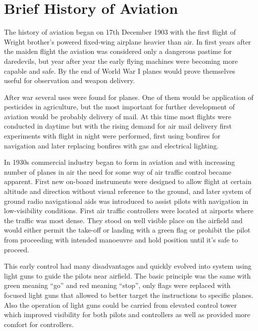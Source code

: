 
\section{Brief History of Aviation}

The history of aviation began on 17th December 1903 with the first flight of Wright brother's powered fixed-wing airplane heavier than air. \cite{nolan} In first years after the maiden flight the aviation was considered only a dangerous pastime for daredevils, but year after year the early flying machines were becoming more capable and safe. By the end of World War I planes would prove themselves useful for observation and weapon delivery.

After war several uses were found for planes. One of them would be application of pesticides in agriculture, but the most important for further development of aviation would be probably delivery of mail. At this time most flights were conducted in daytime but with the rising demand for air mail delivery first experiments with flight in night were performed, first using bonfires for navigation and later replacing bonfires with gas and electrical lighting.

In 1930s commercial industry began to form in aviation and with increasing number of planes in air the need for some way of air traffic control became apparent. First new on-board instruments were designed to allow flight at certain altitude and direction without visual reference to the ground, and later system of ground radio navigational aids was introduced to assist pilots with navigation in low-visibility conditions. First air traffic controllers were located at airports where the traffic was most dense. They stood on well visible place on the airfield and would either permit the take-off or landing with a green flag or prohibit the pilot from proceeding with intended manoeuvre and hold position until it's safe to proceed.

This early control had many disadvantages and quickly evolved into system using light guns to guide the pilots near airfield. The basic principle was the same with green meaning ``go'' and red meaning ``stop'', only flags were replaced with focused light guns that allowed to better target the instructions to specific planes. Also the operation of light guns could be carried from elevated control tower which improved visibility for both pilots and controllers as well as provided more comfort for controllers.


